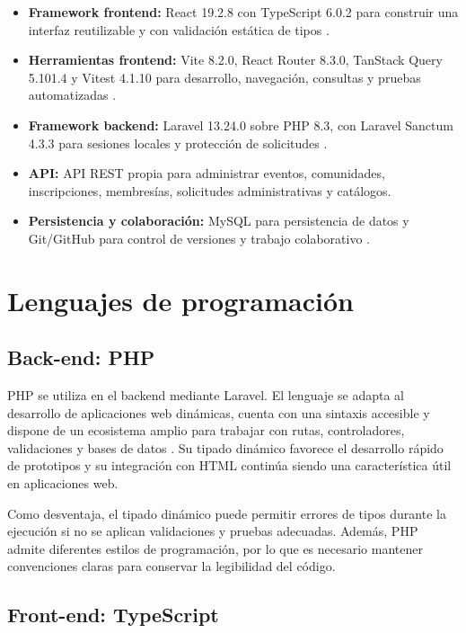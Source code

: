 \documentclass[12pt]{article}
\begin{document}
\begin{itemize}
    \item \textbf{Framework frontend:} React 19.2.8 con TypeScript 6.0.2 para construir una interfaz reutilizable y con validación estática de tipos \cite{react,typescript}.
    \item \textbf{Herramientas frontend:} Vite 8.2.0, React Router 8.3.0, TanStack Query 5.101.4 y Vitest 4.1.10 para desarrollo, navegación, consultas y pruebas automatizadas \cite{vite}.
    \item \textbf{Framework backend:} Laravel 13.24.0 sobre PHP 8.3, con Laravel Sanctum 4.3.3 para sesiones locales y protección de solicitudes \cite{laravel,sanctum}.
    \item \textbf{API:} API REST propia para administrar eventos, comunidades, inscripciones, membresías, solicitudes administrativas y catálogos.
    \item \textbf{Persistencia y colaboración:} MySQL para persistencia de datos y Git/GitHub para control de versiones y trabajo colaborativo \cite{mysql,git}.
\end{itemize}

\section{Lenguajes de programación}

\subsection{Back-end: PHP}

PHP se utiliza en el backend mediante Laravel. El lenguaje se adapta al desarrollo de aplicaciones web dinámicas, cuenta con una sintaxis accesible y dispone de un ecosistema amplio para trabajar con rutas, controladores, validaciones y bases de datos \cite{php}. Su tipado dinámico favorece el desarrollo rápido de prototipos y su integración con HTML continúa siendo una característica útil en aplicaciones web.

Como desventaja, el tipado dinámico puede permitir errores de tipos durante la ejecución si no se aplican validaciones y pruebas adecuadas. Además, PHP admite diferentes estilos de programación, por lo que es necesario mantener convenciones claras para conservar la legibilidad del código.

\subsection{Front-end: TypeScript}
\end{document}

